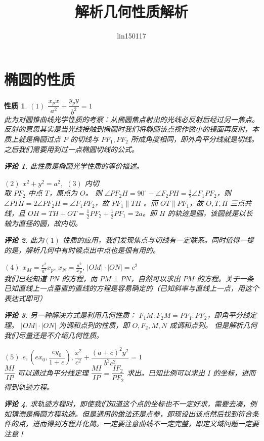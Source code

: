 \documentclass[a4paper,10pt,twoside]{article}
\title{解析几何性质解析}
\author{lin150117}
\date{}
\newtheorem{remark}{评论}
\newtheorem{proposition}{性质}
\begin{document}
\maketitle
\tableofcontents
\newpage
\section{椭圆的性质}
\begin{proposition}
    $  (1) $ $ \dfrac{x_px }{a^2}+\dfrac{y_py}{b^2}=1 $ \\此为对圆锥曲线光学性质的考察：从椭圆焦点射出的光线必反射后经过另一焦点。反射的意思其实是当光线接触到椭圆时我们将椭圆该点视作微小的镜面再反射，本质上就是椭圆过点 $ P $ 的切线与 $ PF_1,PF_2 $ 所成角度相同，即外角平分线就是切线。之后我们需要用到过一点椭圆切线的公式。
    \begin{remark}
        此性质是椭圆光学性质的等价描述。
    \end{remark}
     $ (2) $  $ x^2+y^2=a^2 $,\,  $ (3) $ 内切\\
    取 $ PF_2  $ 中点 $ T  $，原点为 $ O  $。 则 $ \angle PF_2H=90^{\circ }-\angle F_2PH= \frac{1}{2}\angle F_1PF_2 $，则 $ \angle PTH=2\angle PF_2H=\angle F_1PF_2  $，故 $ PF_1\parallel TH  $ 。而 $ OT\parallel PF_1 $，故 $ O,T,H  $ 三点共线，且 $ OH=TH+OT=\frac{1 }{2}PF_2+\frac{1 }{2}PF_1=2a $。即 $ H  $ 的轨迹是圆，该圆就是以长轴为直径的圆，故内切。
    \begin{remark}
        此为$ (1) $ 性质的应用，我们发现焦点与切线有一定联系。同时值得一提的是，解析几何中有时候点出中点也是很有用的。
    \end{remark}
     $ (4) $  $ x_M=\frac{c^2}{a^2}x_p,\,x_N=\frac{a^2}{x_P},\,|OM|\cdot |ON|=c^2 $\\我们已经知道 $ PN  $ 的方程，而 $ PM\perp PN $，自然可以求出 $ PM  $ 的方程。关于一条已知直线上一点垂直的直线的方程是容易确定的（已知斜率与直线上一点，用这个表达式即可）
     \begin{remark}
        另一种解决方式是利用几何性质： $ F_1M:F_2M=PF_1:PF_2 $，即角平分线定理。 $ |OM|\cdot|ON| $ 为调和点列的性质，即 $ O,F_2,M,N  $ 成调和点列。 但是解析几何我们尽量还是不介绍几何性质。
     \end{remark}
      $ (5) $  $ e,(ex_0,\dfrac{ey_0}{1+e}),\dfrac{x^2}{c^2}+\dfrac{(a+c)^2y^2}{b^2c^2}=1 $ 
      \\ $ \dfrac{MI}{IP } $ 可以通过角平分线定理 $ \dfrac{MI}{IP }=\dfrac{IF_2}{PF_2} $ 求出。已知比例可以求出 $ I  $ 的坐标，进而得到轨迹方程。
      \begin{remark}
        求轨迹方程时，即使我们知道这个点的坐标也不一定好求，需要去凑，例如猜测是椭圆方程轨迹。但是通用的做法还是点参，即现设出该点然后找到符合条件的点，进而得到方程并化简。一定要注意曲线不一定完整，即定义域问题一定要注意！

\end{remark}
\end{proposition}
\end{document}
